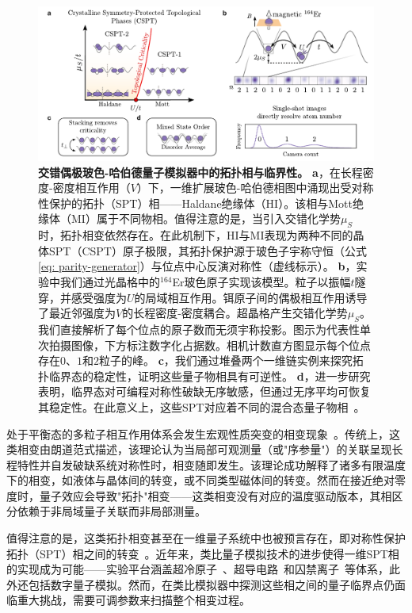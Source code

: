 \documentclass[preprint,superscriptaddress,floatfix, nofootinbib]{revtex4-2}
\begin{document}
\begin{CJK*}{UTF8}{gbsn}
\begin{figure}
    \centering
    \includegraphics[width=\textwidth]{figures/Fig_intro_v4.pdf}
    \caption{\textbf{交错偶极玻色-哈伯德量子模拟器中的拓扑相与临界性。}
    \textbf{a}，在长程密度-密度相互作用（$V$）下，一维扩展玻色-哈伯德相图\cite{Torre2006, Berg2008}中涌现出受对称性保护的拓扑（SPT）相——Haldane绝缘体（HI）。该相与Mott绝缘体（MI）属于不同物相。值得注意的是，当引入交错化学势$\mu_S$时，拓扑相变依然存在。在此机制下，HI与MI表现为两种不同的晶体SPT（CSPT）原子极限，其拓扑保护源于玻色子宇称守恒（公式\eqref{eq: parity-generator}）与位点中心反演对称性（虚线标示）\cite{Fuji2015}。
    \textbf{b}，实验中我们通过光晶格中的$^{164}$Er玻色原子实现该模型。粒子以振幅$t$隧穿，并感受强度为$U$的局域相互作用。铒原子间的偶极相互作用诱导了最近邻强度为$V$的长程密度-密度耦合。超晶格产生交错化学势$\mu_S$。我们直接解析了每个位点的原子数而无须宇称投影。图示为代表性单次拍摄图像，下方标注数字化占据数。相机计数直方图显示每个位点存在$0$、$1$和$2$粒子的峰。
    \textbf{c}，我们通过堆叠两个一维链实例来探究拓扑临界态的稳定性，证明这些量子物相具有可逆性。
    \textbf{d}，进一步研究表明，临界态对可编程对称性破缺无序敏感，但通过无序平均可恢复其稳定性。在此意义上，这些SPT对应着不同的混合态量子物相~\cite{Ma2023}。
    }
    \label{fig: setup}
\end{figure}

处于平衡态的多粒子相互作用体系会发生宏观性质突变的相变现象~\cite{Sachdev1999}。传统上，这类相变由朗道范式描述，该理论认为当局部可观测量（或"序参量"）的关联呈现长程特性并自发破缺系统对称性时，相变随即发生。该理论成功解释了诸多有限温度下的相变，如液体与晶体间的转变，或不同类型磁体间的转变。然而在接近绝对零度时，量子效应会导致"拓扑"相变——这类相变没有对应的温度驱动版本，其相区分依赖于非局域量子关联而非局部测量。

值得注意的是，这类拓扑相变甚至在一维量子系统中也被预言存在，即对称性保护拓扑（SPT）相之间的转变~\cite{Senthil2015, Pollmann2010, Turner11, Fidkowski11, Pollmann2012, Schuch2011, Chen2011, Chen2012}。近年来，类比量子模拟技术的进步使得一维SPT相的实现成为可能——实验平台涵盖超冷原子~\cite{Atala2013, Meier2016, Sylvain2019, Sompet2022}、超导电路~\cite{Cai2019}和囚禁离子~\cite{Katz2024}等体系，此外还包括数字量子模拟\cite{Choo2018, Smith2022, Herrmann2022}。然而，在类比模拟器中探测这些相之间的量子临界点仍面临重大挑战，需要可调参数来扫描整个相变过程。


\end{CJK*}
\end{document}
